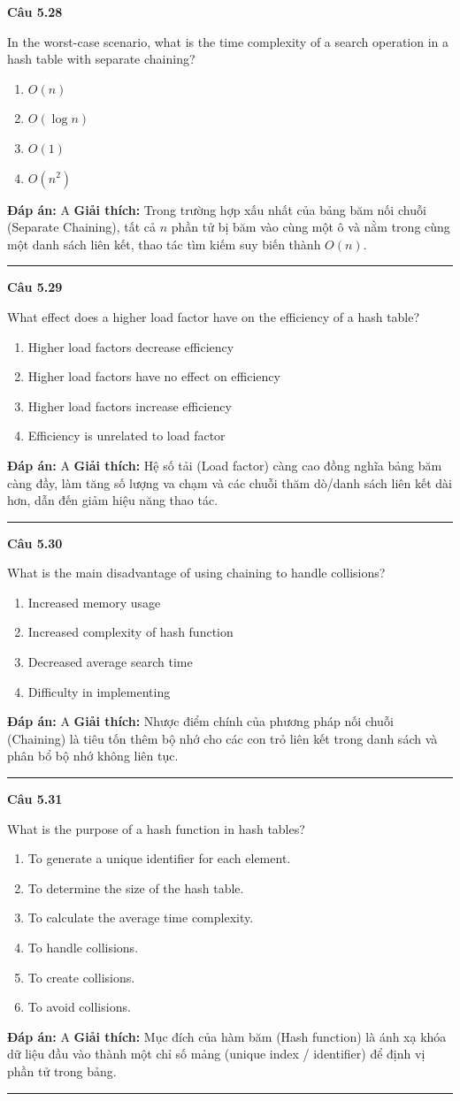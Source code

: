 \documentclass[11pt,a4paper]{article}
\newenvironment{question}[1]{%
  \par\vspace{1em}\noindent\textbf{\large Câu #1}\par\vspace{0.4em}
}{%
  \par\vspace{1em}\hrule\vspace{0.6em}
}
\newenvironment{choices}{%
  \begin{enumerate}[label=\textbf{\Alph*.},leftmargin=2.2em,itemsep=2pt,topsep=3pt]
}{%
  \end{enumerate}
}
\newcommand{\choice}{\item}
\begin{document}
\begin{question}{5.28}
In the worst-case scenario, what is the time complexity of a search operation in a hash table with separate chaining?
\begin{choices}
\choice \(O(n)\)
\choice \(O(\log n)\)
\choice \(O(1)\)
\choice \(O(n^2)\)
\end{choices}
\textbf{Đáp án:} A
\textbf{Giải thích:} Trong trường hợp xấu nhất của bảng băm nối chuỗi (Separate Chaining), tất cả \(n\) phần tử bị băm vào cùng một ô và nằm trong cùng một danh sách liên kết, thao tác tìm kiếm suy biến thành \(O(n)\).
\end{question}

\begin{question}{5.29}
What effect does a higher load factor have on the efficiency of a hash table?
\begin{choices}
\choice Higher load factors decrease efficiency
\choice Higher load factors have no effect on efficiency
\choice Higher load factors increase efficiency
\choice Efficiency is unrelated to load factor
\end{choices}
\textbf{Đáp án:} A
\textbf{Giải thích:} Hệ số tải (Load factor) càng cao đồng nghĩa bảng băm càng đầy, làm tăng số lượng va chạm và các chuỗi thăm dò/danh sách liên kết dài hơn, dẫn đến giảm hiệu năng thao tác.
\end{question}

\begin{question}{5.30}
What is the main disadvantage of using chaining to handle collisions?
\begin{choices}
\choice Increased memory usage
\choice Increased complexity of hash function
\choice Decreased average search time
\choice Difficulty in implementing
\end{choices}
\textbf{Đáp án:} A
\textbf{Giải thích:} Nhược điểm chính của phương pháp nối chuỗi (Chaining) là tiêu tốn thêm bộ nhớ cho các con trỏ liên kết trong danh sách và phân bổ bộ nhớ không liên tục.
\end{question}

\begin{question}{5.31}
What is the purpose of a hash function in hash tables?
\begin{choices}
\choice To generate a unique identifier for each element.
\choice To determine the size of the hash table.
\choice To calculate the average time complexity.
\choice To handle collisions.
\choice To create collisions.
\choice To avoid collisions.
\end{choices}
\textbf{Đáp án:} A
\textbf{Giải thích:} Mục đích của hàm băm (Hash function) là ánh xạ khóa dữ liệu đầu vào thành một chỉ số mảng (unique index / identifier) để định vị phần tử trong bảng.
\end{question}
\end{document}
